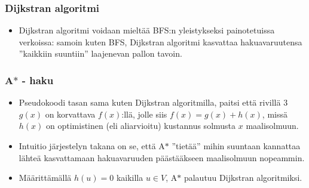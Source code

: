 \documentclass{beamer}
\begin{document}
\begin{frame}
  \frametitle{Dijkstran algoritmi}
  \begin{itemize}
    \item Dijkstran algoritmi voidaan mieltää BFS:n yleistykseksi painotetuissa verkoissa: samoin kuten BFS, Dijkstran algoritmi kasvattaa hakuavaruutensa ''kaikkiin suuntiin'' laajenevan pallon tavoin.
  \end{itemize}
\end{frame}

\begin{frame}
  \frametitle{A$\ast$ - haku}
  \begin{itemize}
    \item Pseudokoodi tasan sama kuten Dijkstran algoritmilla, paitsi että rivillä 3 $g(x)$ on korvattava $f(x)$:llä, jolle siis $f(x) = g(x) + h(x)$, missä $h(x)$ on optimistinen (eli aliarvioitu) kustannus solmusta $x$ maalisolmuun.
    
    \item Intuitio järjestelyn takana on se, että A$\ast$ ''tietää'' mihin suuntaan kannattaa lähteä kasvattamaan hakuavaruuden päästääkseen maalisolmuun nopeammin.
    
    \item Määrittämällä $h(u) = 0$ kaikilla $u \in V$, A$\ast$ palautuu Dijkstran algoritmiksi.
  \end{itemize}
\end{frame}
\end{document}
